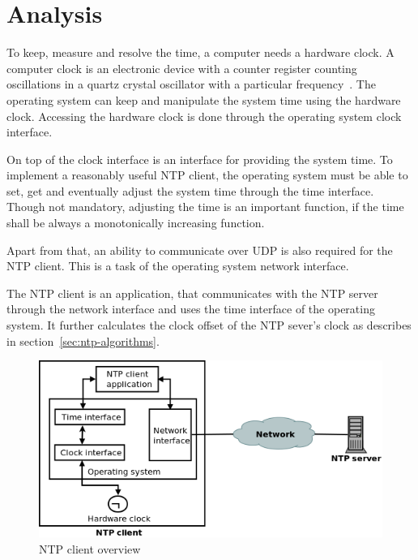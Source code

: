
\chapter{Analysis}
To keep, measure and resolve the time, a computer needs a hardware clock.
A computer clock is an electronic device with a counter register counting oscillations in a
quartz crystal oscillator with a particular frequency~\cite{thesis-sync}.
The operating system can keep and manipulate the system time using the hardware clock.
Accessing the hardware clock is done through the operating system clock interface.

On top of the clock interface is an interface for providing the system time.
To implement a reasonably useful NTP client,
the operating system must be able to set, get and eventually adjust the system time
through the time interface.
Though not mandatory, adjusting the time is an important function,
if the time shall be always a monotonically increasing function.

Apart from that, an ability to communicate over UDP is also required for the NTP client.
This is a task of the operating system network interface.

The NTP client is an application, that communicates with the NTP server through the network interface
and uses the time interface of the operating system.
It further calculates the clock offset of the NTP sever's clock
as describes in section~\ref{sec:ntp-algorithms}.

\begin{figure}
  \centering
  \includegraphics[width=13cm,keepaspectratio]{fig/analysis.png}
  \caption{NTP client overview} %
  \label{fig:analysis-overview} %
\end{figure}

